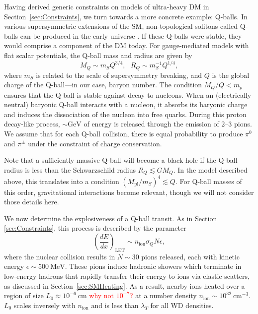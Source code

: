 \documentclass[twocolumn, preprintnumbers,amsmath,amssymb,prd, superscriptaddress]{revtex4}
\def\r{\right)}
\def\l{\left(}
\begin{document}
Having derived generic constraints on models of ultra-heavy DM in Section~\ref{sec:Constraints}, we turn towards a more concrete example: Q-balls.
In various supersymmetric extensions of the SM, non-topological solitons called Q-balls can be produced in the early universe \cite{Coleman:1985ki, Kusenko:1997si}.
If these Q-balls were stable, they would comprise a component of the DM today.
For gauge-mediated models with flat scalar potentials, the Q-ball mass and radius are given by
\begin{equation}
\label{eq:Qballprop}
M_Q \sim m_S Q^{3/4}, ~~~ R_Q \sim m_S^{-1} Q^{1/4},
\end{equation}
where $m_S$ is related to the scale of supersymmetry breaking, and $Q$ is the global charge of the Q-ball---in our case, baryon number.
The condition $M_Q/Q < m_p$ ensures that the Q-ball is stable against decay to nucleons.
When an (electrically neutral) baryonic Q-ball interacts with a nucleon, it absorbs its baryonic charge and induces the dissociation of the nucleon into free quarks.
During this proton decay-like process, $\sim \text{GeV}$ of energy is released through the emission of 2--3 pions.
We assume that for each Q-ball collision, there is equal probability to produce $\pi^0$ and $\pi^\pm$ under the constraint of charge conservation.

Note that a sufficiently massive Q-ball will become a black hole if the Q-ball radius is less than the Schwarzschild radius $R_Q \lesssim G M_Q$.
In the model described above, this translates into a condition $(M_\text{pl}/m_S)^4 \lesssim Q$.
For Q-ball masses of this order, gravitational interactions become relevant, though we will not consider those details here.

We now determine the explosiveness of a Q-ball transit.
As in Section \ref{sec:Constraints}, this process is described by the parameter
\begin{equation}
\label{eq:QballLET}
\l\frac{dE}{dx}\r_\text{LET} \sim n_\text{ion} \sigma_Q N \epsilon,
\end{equation}
where the nuclear collision results in $N \sim 30$ pions released, each with kinetic energy $\epsilon \sim 500 ~\text{MeV}$.
These pions induce hadronic showers which terminate in low-energy hadrons that rapidly transfer their energy to ions via elastic scatters, as discussed in Section~\ref{sec:SMHeating}.
As a result, nearby ions heated over a region of size $L_0 \approx 10^{-6} ~\text{cm}$ \textcolor{red}{why not $10^{-7}$?} at a number density $n_\text{ion} \sim 10^{32}~\text{cm}^{-3}$.
$L_0$ scales inversely with $n_\text{ion}$ and is less than $\lambda_T$ for all WD densities.
\end{document}

